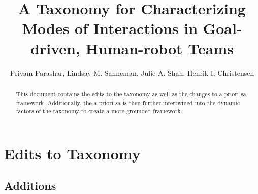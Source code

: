 \documentclass[letterpaper, 10 pt, conference]{ieeeconf} %
\title{\LARGE \bf A Taxonomy for Characterizing Modes of Interactions in Goal-driven, Human-robot
  Teams } \newcommand{\citet}[1]{\citeauthor{#1}~\cite{#1}}
\author{ Priyam Parashar, Lindsay M. Sanneman, Julie A. Shah, Henrik I. Christensen }
\begin{document}
\maketitle
\thispagestyle{empty} \pagestyle{empty}


\begin{abstract}
  This document contains the edits to the taxonomy as well as the changes to a priori sa framework.
  Additionally, the a priori sa is then further intertwined into the dynamic factors of the taxonomy
  to create a more grounded framework.
\end{abstract}



\section{Edits to Taxonomy}

\subsection{Additions}
\end{document}
